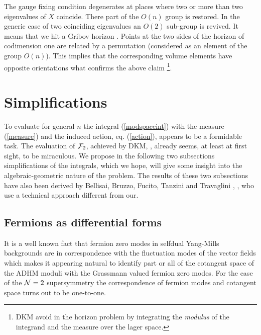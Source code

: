 \documentclass[a4paper,12pt]{article}
\begin{document}
The gauge fixing condition degenerates at places where two or more 
than two eigenvalues of $X$ coincide. There part of the $O(n)$ 
group is restored. In the generic case of two coinciding eigenvalues 
an $O(2)$ sub-group is revived. It means that we hit a Gribov 
horizon \cite{gribov}. Points at the two sides of the horizon 
of codimension one are 
related by a permutation (considered as an element of the group 
$O(n)$). This implies that the corresponding volume elements have 
opposite orientations what confirms the above claim 
\footnote{DKM avoid in \cite{dorey1} 
the horizon problem  by integrating the {\it modulus} of the integrand 
and the measure over the lager space.}. 

\section{Simplifications}\label{sec:III} 

To evaluate for general $n$ the integral (\ref{modspaceint}) with 
the measure (\ref{measure}) and the induced action, eq. 
(\ref{action}), appears to be a formidable task. The evaluation 
of ${\cal F}_2$, achieved by DKM, \cite{dorey1}, already seems, at 
least at first 
sight, to be miraculous. We propose in the following two 
subsections simplifications of the integrals, which we hope, will 
give some insight into the algebraic-geometric nature of the 
problem. The results of these two subsections have also 
been derived by Bellisai, Bruzzo, Fucito, Tanzini and Travaglini 
\cite{tanzini1}, \cite{tanzini2}, who use a technical approach different 
from our. 

\subsection{Fermions as differential forms}

It is a well known fact that fermion zero modes in selfdual Yang-Mills 
backgrounds are in correspondence with the fluctuation modes of the 
vector fields which makes it appearing natural to identify part or 
all of the cotangent space of the ADHM moduli with the Grassmann 
valued fermion zero modes. For 
the case of the ${\cal N}=2$ supersymmetry the correspondence of 
fermion modes and cotangent space turns out to be one-to-one. 
\end{document}
